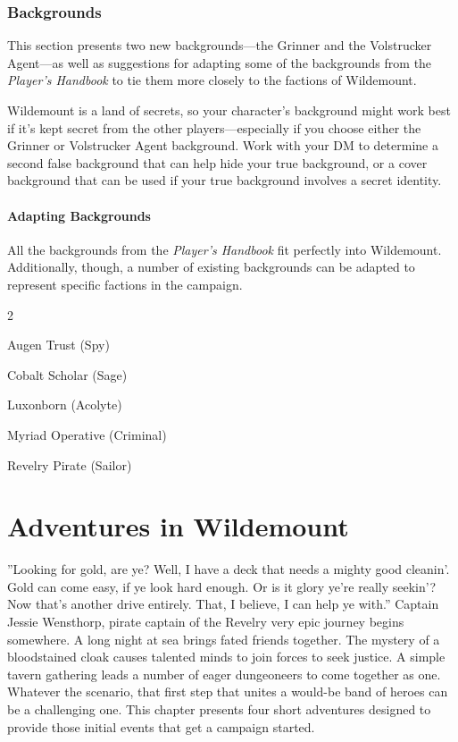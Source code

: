\documentclass[10pt,a4paper,twoside,bg=print,twocolumn,openany,nodeprecatedcode]{dndbook}
\begin{document}
\subsection{Backgrounds}
This section presents two new backgrounds—the Grinner and the Volstrucker Agent—as well as suggestions for adapting some of the backgrounds from the \textit{Player's Handbook} to tie them more closely to the factions of Wildemount.

Wildemount is a land of secrets, so your character's background might work best if it's kept secret from the other players—especially if you choose either the Grinner or Volstrucker Agent background. Work with your DM to determine a second false background that can help hide your true background, or a cover background that can be used if your true background involves a secret identity.

\subsubsection{Adapting Backgrounds}
All the backgrounds from the \textit{Player's Handbook} fit perfectly into Wildemount. Additionally, though, a number of existing backgrounds can be adapted to represent specific factions in the campaign.


\begin{itemize}
\begin{multicols}{2}
\item Augen Trust (Spy)
\item Cobalt Scholar (Sage)
\item Luxonborn (Acolyte)
\item Myriad Operative (Criminal)
\item Revelry Pirate (Sailor)
\end{multicols}

\end{itemize}

\chapter{Adventures in Wildemount}
\DndQuote%
{}
{''Looking for gold, are ye? Well, I have a deck that needs a mighty good cleanin'. Gold can come easy, if ye look hard enough. Or is it glory ye're really seekin'? Now that's another drive entirely. That, I believe, I can help ye with.''}
{Captain Jessie Wensthorp, pirate captain of the Revelry}
very epic journey begins somewhere. A long night at sea brings fated friends together. The mystery of a bloodstained cloak causes talented minds to join forces to seek justice. A simple tavern gathering leads a number of eager dungeoneers to come together as one. Whatever the scenario, that first step that unites a would-be band of heroes can be a challenging one. This chapter presents four short adventures designed to provide those initial events that get a campaign started.
\end{document}
